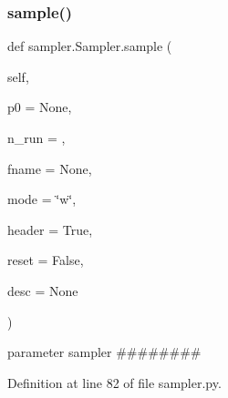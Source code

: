 \subsubsection{\texorpdfstring{sample()}{sample()}}
{\footnotesize\ttfamily def sampler.\+Sampler.\+sample (\begin{DoxyParamCaption}\item[{}]{self,  }\item[{}]{p0 = {\ttfamily None},  }\item[{}]{n\+\_\+run = {},  }\item[{}]{fname = {\ttfamily None},  }\item[{}]{mode = {\ttfamily \char`\"{}w\char`\"{}},  }\item[{}]{header = {\ttfamily True},  }\item[{}]{reset = {\ttfamily False},  }\item[{}]{desc = {\ttfamily None} }\end{DoxyParamCaption})}



parameter sampler \#\#\#\#\#\#\#\# 



Definition at line 82 of file sampler.\+py.


